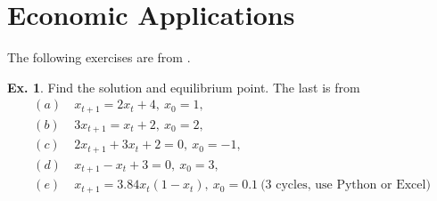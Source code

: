 \documentclass[11pt,a4paper]{book}
\theoremstyle{definition}\newtheorem{definition}{Definition}
\theoremstyle{definition}\newtheorem{fact}{Fact}
\theoremstyle{definition}\newtheorem{remark}{Remark}
\theoremstyle{definition}\newtheorem{ex}{Ex.}
\theoremstyle{definition}\newtheorem{project}{Project}
\theoremstyle{definition}\newtheorem{problem}{Problem}
\theoremstyle{definition}\newtheorem{example}{Example}
\numberwithin{theorem}{section}
\numberwithin{corollary}{chapter}
\numberwithin{assumption}{chapter}
\numberwithin{definition}{chapter}
\numberwithin{prop}{chapter}
\numberwithin{notation}{chapter}
\numberwithin{problem}{chapter}
\numberwithin{example}{chapter}
\numberwithin{fact}{chapter}
\numberwithin{ex}{chapter}
\begin{document}
	\section{Economic Applications}
	The following exercises are from \citet[p.395--399]{sydsaeter2008further}.
	\begin{ex}
		Find the solution and equilibrium point. The last is from \citet[p.139]{shone2002economic}
		\begin{align*}
			(a)\ & x_{t+1} = 2 x_t + 4, \ x_0 = 1, \\
			(b)\ & 3 x_{t+1} = x_t +2, \ x_0 = 2, \\
			(c)\ & 2 x_{t+1} + 3 x_t + 2 = 0, \ x_0 = -1, \\
			(d)\ & x_{t+1} - x_t + 3 = 0, \ x_0 = 3, \\
			(e)\ & x_{t+1} = 3.84 x_t (1-x_t), \ x_0 = 0.1 \ \text{(3 cycles, use Python or Excel)}
		\end{align*}
	\end{ex}
	
\end{document}
